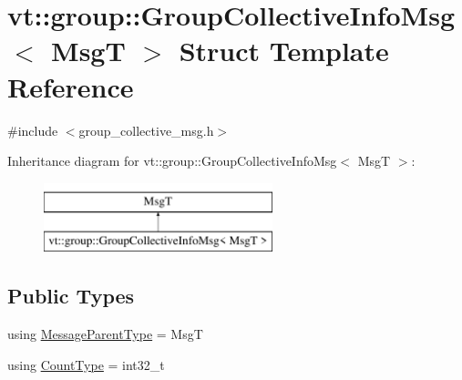 \hypertarget{structvt_1_1group_1_1_group_collective_info_msg}{}\section{vt\+:\+:group\+:\+:Group\+Collective\+Info\+Msg$<$ MsgT $>$ Struct Template Reference}
\label{structvt_1_1group_1_1_group_collective_info_msg}


{\ttfamily \#include $<$group\+\_\+collective\+\_\+msg.\+h$>$}

Inheritance diagram for vt\+:\+:group\+:\+:Group\+Collective\+Info\+Msg$<$ MsgT $>$\+:\begin{figure}[H]
\begin{center}
\leavevmode
\includegraphics[height=2.000000cm]{structvt_1_1group_1_1_group_collective_info_msg}
\end{center}
\end{figure}
\subsection*{Public Types}
\begin{DoxyCompactItemize}
\item 
using \hyperlink{structvt_1_1group_1_1_group_collective_info_msg_a4e5fd50029cce20871f7fb401f1aee5d}{Message\+Parent\+Type} = MsgT
\item 
using \hyperlink{structvt_1_1group_1_1_group_collective_info_msg_a3d20316314d3cc3ac13ff4c5250203a5}{Count\+Type} = int32\+\_\+t
\end{DoxyCompactItemize}
